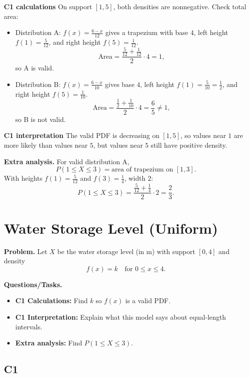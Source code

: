 	\textbf{C1 calculations}
	On support $[1,5]$, both densities are nonnegative. Check total area:
	\begin{itemize}
		\item Distribution A: $f(x)=\frac{6-x}{12}$ gives a trapezium with base $4$, left height $f(1)=\frac{5}{12}$, and right height $f(5)=\frac{1}{12}$.
		\[
		\text{Area}=\frac{\frac{5}{12}+\frac{1}{12}}{2}\cdot 4=1,
		\]
		so A is valid.
		\item Distribution B: $f(x)=\frac{6-x}{10}$ gives base $4$, left height $f(1)=\frac{5}{10}=\frac12$, and right height $f(5)=\frac{1}{10}$.
		\[
		\text{Area}=\frac{\frac12+\frac{1}{10}}{2}\cdot 4=\frac65\ne1,
		\]
		so B is not valid.
	\end{itemize}
	
	\textbf{C1 interpretation}
	The valid PDF is decreasing on $[1,5]$, so values near $1$ are more likely than values near $5$, but values near $5$ still have positive density.
	
	\textbf{Extra analysis.}
	For valid distribution A,
	\[
	P(1\le X\le3)=\text{area of trapezium on }[1,3].
	\]
	With heights $f(1)=\frac{5}{12}$ and $f(3)=\frac14$, width $2$:
	\[
	P(1\le X\le3)=\frac{\frac{5}{12}+\frac14}{2}\cdot 2=\frac23.
	\]

	\section{Water Storage Level (Uniform)}
	
	\textbf{Problem.}
	Let $X$ be the water storage level (in m) with support $[0,4]$ and density
	\[
	f(x)=k\quad\text{for }0\le x\le 4.
	\]
	
	\textbf{Questions/Tasks.}
	\begin{itemize}
		\item \textbf{C1 Calculations:} Find $k$ so $f(x)$ is a valid PDF.
		\item \textbf{C1 Interpretation:} Explain what this model says about equal-length intervals.
		\item \textbf{Extra analysis:} Find $P(1\le X\le 3)$.
	\end{itemize}

	\subsection*{C1}

